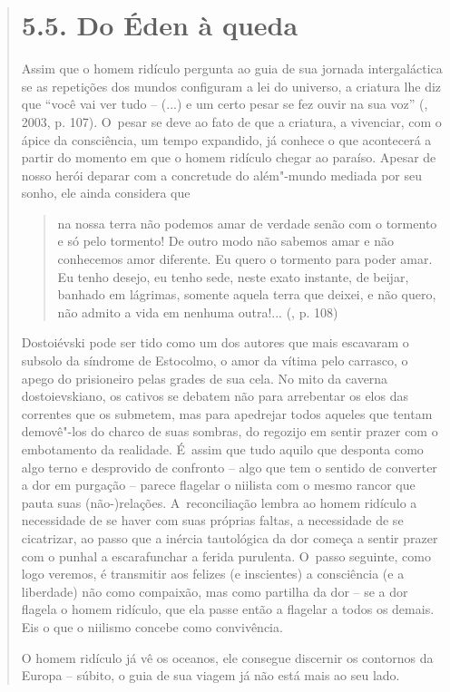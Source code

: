 {\begin{quote}
\section{5.5. Do Éden à queda}

Assim que o homem ridículo pergunta ao guia de sua jornada
intergaláctica se as repetições dos mundos configuram a lei do universo,
a criatura lhe diz que ``você vai ver tudo -- (...) e um certo pesar se
fez ouvir na sua voz'' (, 2003, p. 107). O~pesar se deve ao
fato de que a criatura, a vivenciar, com o ápice da consciência, um
tempo expandido, já conhece o que acontecerá a partir do momento em que
o homem ridículo chegar ao paraíso. Apesar de nosso herói deparar com a
concretude do além"-mundo mediada por seu sonho, ele ainda considera que

\begin{quote}
na nossa terra não podemos amar de verdade senão com o tormento e só
pelo tormento! De outro modo não sabemos amar e não conhecemos amor
diferente. Eu quero o tormento para poder amar. Eu tenho desejo, eu
tenho sede, neste exato instante, de beijar, banhado em lágrimas,
somente aquela terra que deixei, e não quero, não admito a vida em
nenhuma outra!... (, p. 108)
\end{quote}

Dostoiévski pode ser tido como um dos autores que mais escavaram o
subsolo da síndrome de Estocolmo, o amor da vítima pelo carrasco, o
apego do prisioneiro pelas grades de sua cela. No mito da caverna
dostoievskiano, os cativos se debatem não para arrebentar os elos das
correntes que os submetem, mas para apedrejar todos aqueles que tentam
demovê"-los do charco de suas sombras, do regozijo em sentir prazer com o
embotamento da realidade. É~assim que tudo aquilo que desponta como algo
terno e desprovido de confronto -- algo que tem o sentido de converter a
dor em purgação -- parece flagelar o niilista com o mesmo rancor que
pauta suas (não-)relações. A~reconciliação lembra ao homem ridículo a
necessidade de se haver com suas próprias faltas, a necessidade de se
cicatrizar, ao passo que a inércia tautológica da dor começa a sentir
prazer com o punhal a escarafunchar a ferida purulenta. O~passo
seguinte, como logo veremos, é transmitir aos felizes (e inscientes) a
consciência (e a liberdade) não como compaixão, mas como partilha da dor
-- se a dor flagela o homem ridículo, que ela passe então a flagelar a
todos os demais. Eis o que o niilismo concebe como convivência.

O homem ridículo já vê os oceanos, ele consegue discernir os contornos
da Europa -- súbito, o guia de sua viagem já não está mais ao seu lado.


\end{quote}}
